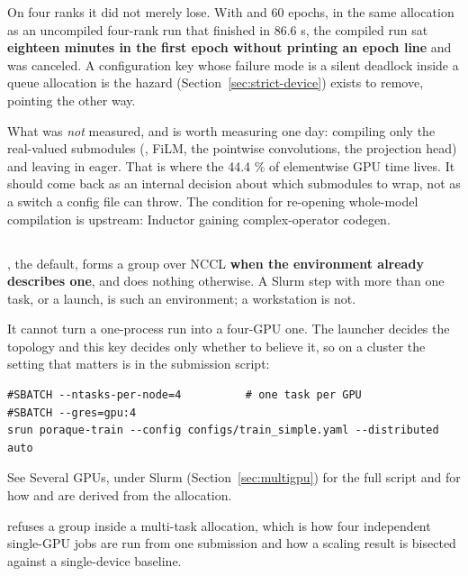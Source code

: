 On four ranks it did not merely lose. With  and 60 epochs, in the same allocation as an uncompiled four-rank run that finished in 86.6 s, the compiled run sat \textbf{eighteen minutes in the first epoch without printing an epoch line} and was canceled. A configuration key whose failure mode is a silent deadlock inside a queue allocation is the hazard  (Section~\ref{sec:strict-device}) exists to remove, pointing the other way.

What was \emph{not} measured, and is worth measuring one day: compiling only the real-valued submodules (, FiLM, the pointwise convolutions, the projection head) and leaving  in eager. That is where the 44.4 \% of elementwise GPU time lives. It should come back as an internal decision about which submodules to wrap, not as a switch a config file can throw. The condition for re-opening whole-model compilation is upstream: Inductor gaining complex-operator codegen.

\subsection{}

\label{sec:distributed}

, the default, forms a  group over NCCL \textbf{when the environment already describes one}, and does nothing otherwise. A Slurm step with more than one task, or a  launch, is such an environment; a workstation is not.

It cannot turn a one-process run into a four-GPU one. The launcher decides the topology and this key decides only whether to believe it, so on a cluster the setting that matters is in the submission script:

\begin{lstlisting}
#SBATCH --ntasks-per-node=4          # one task per GPU
#SBATCH --gres=gpu:4
srun poraque-train --config configs/train_simple.yaml --distributed auto
\end{lstlisting}

See Several GPUs, under Slurm (Section~\ref{sec:multigpu}) for the full script and for how  and  are derived from the allocation.

 refuses a group inside a multi-task allocation, which is how four independent single-GPU jobs are run from one submission and how a scaling result is bisected against a single-device baseline.

